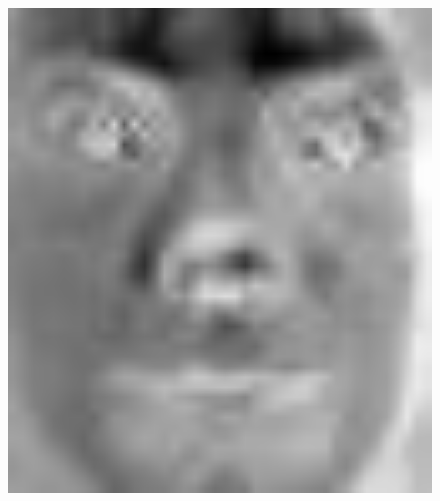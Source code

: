 \documentclass[english,onecolumn]{IEEEtran}
\begin{document}
\begin{enumerate}
\begin{enumerate}
\begin{figure}[htbp]
{\begin{minipage}[t]{0.2\linewidth}
                \includegraphics[width=1\textwidth]{figures/p4/problem2/eigenface_2.jpg}
                \end{minipage}
            }
\end{figure}
\end{enumerate}
\end{enumerate}
\end{document}

